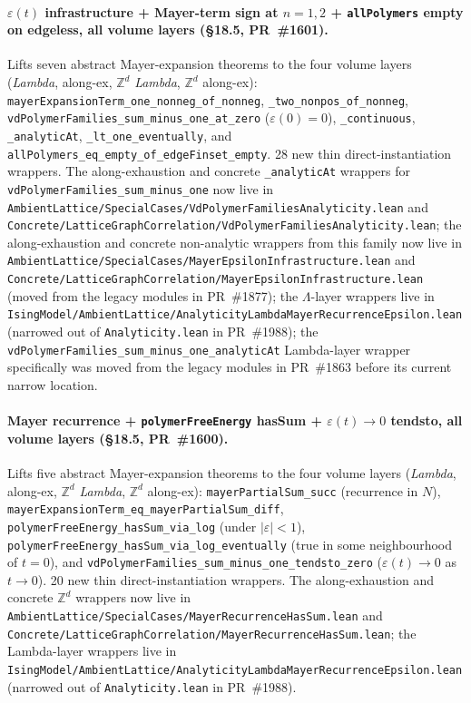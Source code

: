 \documentclass[a4paper,11pt]{article}
\begin{document}
\paragraph{$\varepsilon(t)$ infrastructure + Mayer-term sign at
$n = 1, 2$ + \texttt{allPolymers} empty on edgeless, all volume
layers (\S18.5, PR~\#1601).} Lifts seven abstract Mayer-expansion
theorems to the four volume layers (\textit{Lambda}, along-ex,
$\mathbb{Z}^d$ \textit{Lambda}, $\mathbb{Z}^d$ along-ex):
\texttt{mayerExpansionTerm\_one\_nonneg\_of\_nonneg},
\texttt{\_two\_nonpos\_of\_nonneg},
\texttt{vdPolymerFamilies\_sum\_minus\_one\_at\_zero}
($\varepsilon(0) = 0$),
\texttt{\_continuous}, \texttt{\_analyticAt},
\texttt{\_lt\_one\_eventually}, and
\texttt{allPolymers\_eq\_empty\_of\_edgeFinset\_empty}.
28 new thin direct-instantiation wrappers. The along-exhaustion and
concrete \texttt{\_analyticAt} wrappers for
\texttt{vdPolymerFamilies\_sum\_minus\_one} now live in
\texttt{AmbientLattice/SpecialCases/VdPolymerFamiliesAnalyticity.lean}
and
\texttt{Concrete/LatticeGraphCorrelation/VdPolymerFamiliesAnalyticity.lean};
the along-exhaustion and concrete non-analytic wrappers from this family
now live in
\texttt{AmbientLattice/SpecialCases/MayerEpsilonInfrastructure.lean}
and
\texttt{Concrete/LatticeGraphCorrelation/MayerEpsilonInfrastructure.lean}
(moved from the legacy modules in PR~\#1877);
the $\Lambda$-layer wrappers live in
\texttt{IsingModel/AmbientLattice/AnalyticityLambdaMayerRecurrenceEpsilon.lean}
(narrowed out of \texttt{Analyticity.lean} in PR~\#1988); the
\texttt{vdPolymerFamilies\_sum\_minus\_one\_analyticAt} Lambda-layer
wrapper specifically was moved from the legacy modules in PR~\#1863
before its current narrow location.

\paragraph{Mayer recurrence + \texttt{polymerFreeEnergy} hasSum +
$\varepsilon(t) \to 0$ tendsto, all volume layers (\S18.5,
PR~\#1600).} Lifts five abstract Mayer-expansion theorems to the
four volume layers (\textit{Lambda}, along-ex, $\mathbb{Z}^d$
\textit{Lambda}, $\mathbb{Z}^d$ along-ex):
\texttt{mayerPartialSum\_succ} (recurrence in $N$),
\texttt{mayerExpansionTerm\_eq\_mayerPartialSum\_diff},
\texttt{polymerFreeEnergy\_hasSum\_via\_log} (under $|\varepsilon|
< 1$),
\texttt{polymerFreeEnergy\_hasSum\_via\_log\_eventually} (true
in some neighbourhood of $t = 0$), and
\texttt{vdPolymerFamilies\_sum\_minus\_one\_tendsto\_zero}
($\varepsilon(t) \to 0$ as $t \to 0$). 20 new thin
direct-instantiation wrappers. The along-exhaustion and concrete
$\mathbb{Z}^d$ wrappers now live in
\texttt{AmbientLattice/SpecialCases/MayerRecurrenceHasSum.lean}
and
\texttt{Concrete/LatticeGraphCorrelation/MayerRecurrenceHasSum.lean};
the Lambda-layer wrappers live in
\texttt{IsingModel/AmbientLattice/AnalyticityLambdaMayerRecurrenceEpsilon.lean}
(narrowed out of \texttt{Analyticity.lean} in PR~\#1988).
\end{document}
